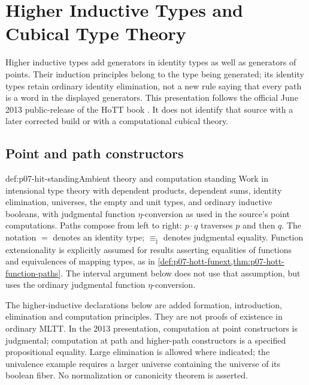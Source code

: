 \chapter{Higher Inductive Types and Cubical Type Theory}
\label{sec:p07-higher-inductive-types}

Higher inductive types add generators in identity types as well as generators
of points. Their induction principles belong to the type being generated;
its identity types retain ordinary identity elimination, not a new rule saying
that every path is a word in the displayed generators. This presentation
follows the official June 2013 public-release of the HoTT book
\cite[Chapter~6]{HoTT2013PublicReleaseFoundations}. It does not identify that source
with a later corrected build or with a computational cubical theory.

\section{Point and path constructors}

\begin{hbconvention}{def:p07-hit-standing}{Ambient theory and computation standing}
Work in intensional type theory with dependent products, dependent sums,
identity elimination, universes, the empty and unit types, and ordinary
inductive booleans, with judgmental function \(\eta\)-conversion as used
in the source's point computations. Paths compose from left to right: \(p\cdot q\)
traverses \(p\) and then \(q\). The notation \(=\) denotes an identity
type; \(\equiv_{\mathrm j}\) denotes judgmental equality. Function
extensionality is explicitly assumed for results asserting equalities of
functions and equivalences of mapping types, as in
\cref{def:p07-hott-funext,thm:p07-hott-function-paths}.
The interval argument below does not use that assumption, but uses the
ordinary judgmental function \(\eta\)-conversion.

The higher-inductive declarations below are added formation, introduction,
elimination and computation principles. They are not proofs of existence in
ordinary MLTT. In the 2013 presentation, computation at point constructors
is judgmental; computation at path and higher-path constructors is a specified
propositional equality. Large elimination is allowed where indicated; the
univalence example requires a larger universe containing the universe of its
boolean fiber. No normalization or canonicity theorem is asserted.
\end{hbconvention}

